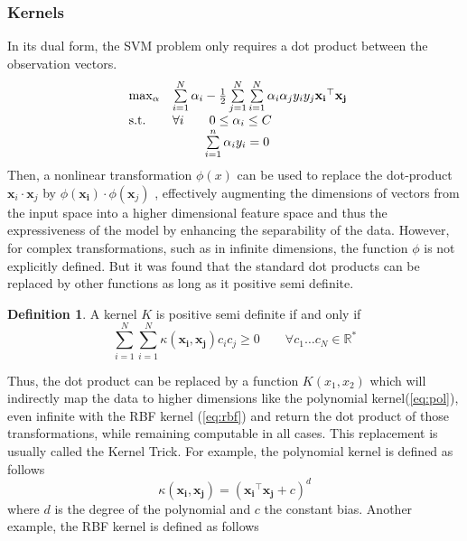\documentclass{article}
\let\vec\mathbf
\newcommand*{\R}{%
  \mathbb{R}%
}
\theoremstyle{definition}
\newtheorem{definition}{Definition}
\begin{document}
\subsubsection{Kernels}
In its dual form, the SVM problem only requires a dot product between the observation vectors. 
\begin{equation}
	\begin{array}{ll@{}ll}
	\max_{\alpha} & \sum\limits_{i=1}^{N} \alpha_i - \frac{1}{2} \sum\limits_{j=1}^{N}\sum\limits_{i=1}^{N}\alpha_{i}\alpha_{j}y_{i}y_{j}\vec{x_{i}}^{\top}\vec{x_{j}}\\
	\text{s.t.} & \forall i\qquad 0 \leq \alpha_{i} \leq C\\
	& \qquad \;\; \sum\limits_{i=1}^{n} \alpha_{i}y_{i}=0
	\end{array}
\end{equation}
Then, a nonlinear transformation $\phi(x)$ can be used to replace the dot-product $\vec{x}_i \cdot \vec{x}_j$ by $\phi(\vec{x_{i}})\cdot\phi(\vec{x}_{j})$ , effectively augmenting the dimensions of vectors from the input space into a higher dimensional feature space and thus the expressiveness of the model by enhancing the separability of the data. However, for complex transformations, such as in infinite dimensions, the function $\phi$ is not explicitly defined. But it was found\cite{cortes_support-vector_1995} that the standard dot products can be replaced by other functions as long as it positive semi definite. 
\begin{definition}
	A kernel $K$ is positive semi definite if and only if\\
    \begin{equation}
    	\sum\limits_{i=1}^{N}\sum\limits_{i=1}^{N}\kappa(\vec{x_{i}},\vec{x_{j}})c_{i}c_{j} \geq 0 \qquad \forall c_1\dots c_N \in \R^*
    \end{equation}
\end{definition}
Thus, the dot product can be replaced by a function $K(x_1,x_2)$ which will indirectly map the data to higher dimensions like the polynomial kernel(\ref{eq:pol}), even infinite with the RBF kernel (\ref{eq:rbf}) and return the dot product of those transformations, while remaining computable in all cases. This replacement is usually called the Kernel Trick. For example, the polynomial kernel is defined as follows
\begin{equation}
	\label{eq:pol}
	\kappa(\vec{x_{i}},\vec{x_{j}})=(\vec{x_{i}}^{\top}\vec{x_{j}}+c)^d
\end{equation}
where $d$ is the degree of the polynomial and $c$ the constant bias. Another example, the RBF kernel is defined as follows
\end{document}
